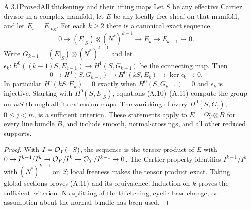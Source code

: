 
\begin{statement}{A.3.1}{Proved}{All thickenings and their lifting maps}
Let $S$ be any effective Cartier divisor in a complex manifold, let $E$ be any locally free sheaf on that manifold, and let $E_k=E|_{kS}$. For each $k\ge2$ there is a canonical exact sequence
\[
0\longrightarrow (E|_S)\otimes(N^*)^{k-1}
 \longrightarrow E_k\longrightarrow E_{k-1}\longrightarrow0.
\tag{A.10}
\]
Write $G_{k-1}=(E|_S)\otimes(N^*)^{k-1}$ and let
$\epsilon_k:H^0((k-1)S,E_{k-1})\to H^1(S,G_{k-1})$
be the connecting map. Then
\[
0\longrightarrow H^0(S,G_{k-1})\longrightarrow H^0(kS,E_k)
 \longrightarrow\ker\epsilon_k\longrightarrow0.
\tag{A.11}
\]
In particular $H^0(kS,E_k)=0$ exactly when $H^0(S,G_{k-1})=0$ and $\epsilon_k$ is injective. Starting with $H^0(S,E|_S)$, equations (A.10)--(A.11) compute the group on $mS$ through all its extension maps. The vanishing of every $H^0(S,G_j)$, $0\le j<m$, is a sufficient criterion. These statements apply to $E=\Omega_Y^1\otimes B$ for every line bundle $B$, and include smooth, normal-crossings, and all other reduced supports.
\end{statement}
\begin{proof}
With $I=\mathcal O_Y(-S)$, the sequence is the tensor product of $E$ with
$0\to I^{k-1}/I^k\to\mathcal O_Y/I^k\to\mathcal O_Y/I^{k-1}\to0$.
The Cartier property identifies $I^{k-1}/I^k$ with $(N^*)^{k-1}$ on $S$; local freeness makes the tensor product exact. Taking global sections proves (A.11) and its equivalence. Induction on $k$ proves the sufficient criterion. No splitting of the thickening, cyclic base change, or assumption about the normal bundle has been used.
\end{proof}



